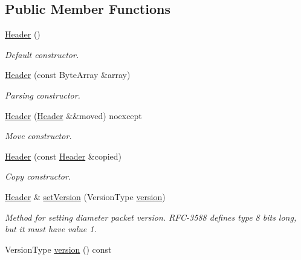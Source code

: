 \subsection*{Public Member Functions}
\begin{DoxyCompactItemize}
\item 
\mbox{\label{classDiameter_1_1Packet_1_1Header_a91f757fd572e26f7862de272c40735c1}} 
\hyperlink{classDiameter_1_1Packet_1_1Header_a91f757fd572e26f7862de272c40735c1}{Header} ()
\begin{DoxyCompactList}\small\item\em Default constructor. \end{DoxyCompactList}\item 
\hyperlink{classDiameter_1_1Packet_1_1Header_a730fdd42fba72b5d6a366d939753c258}{Header} (const Byte\+Array \&array)
\begin{DoxyCompactList}\small\item\em Parsing constructor. \end{DoxyCompactList}\item 
\hyperlink{classDiameter_1_1Packet_1_1Header_ac7eaf975b01659bc10c2ce5d20ad926d}{Header} (\hyperlink{classDiameter_1_1Packet_1_1Header}{Header} \&\&moved) noexcept
\begin{DoxyCompactList}\small\item\em Move constructor. \end{DoxyCompactList}\item 
\hyperlink{classDiameter_1_1Packet_1_1Header_a5540196c67b52fa60945d12b1df28088}{Header} (const \hyperlink{classDiameter_1_1Packet_1_1Header}{Header} \&copied)
\begin{DoxyCompactList}\small\item\em Copy constructor. \end{DoxyCompactList}\item 
\hyperlink{classDiameter_1_1Packet_1_1Header}{Header} \& \hyperlink{classDiameter_1_1Packet_1_1Header_a0da1ec23a71eabc974ae21386ee154de}{set\+Version} (Version\+Type \hyperlink{classDiameter_1_1Packet_1_1Header_a8b2344000890055a9ef037888d0442c3}{version})
\begin{DoxyCompactList}\small\item\em Method for setting diameter packet version. R\+F\+C-\/3588 defines type 8 bits long, but it must have value 1. \end{DoxyCompactList}\item 
Version\+Type \hyperlink{classDiameter_1_1Packet_1_1Header_a8b2344000890055a9ef037888d0442c3}{version} () const

\end{DoxyCompactItemize}
